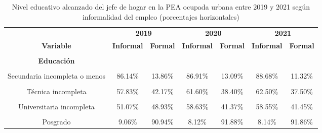 \documentclass[
  letterpaper,
  12pt,
  oneside,
  spanish,
  doublespacing,
  headsepline,
  parskip]{MastersDoctoralThesis}
\begin{document}
\hypertarget{tbl-edu}{}
\begin{table}[H]
\caption{\label{tbl-edu}Nivel educativo alcanzado del jefe de hogar en la PEA ocupada urbana
entre 2019 y 2021 según informalidad del empleo (porcentajes
horizontales) }\tabularnewline

\centering\begingroup\fontsize{10}{12}\selectfont

\begin{tabular}{ccccccc}
\toprule
\multicolumn{1}{c}{ } & \multicolumn{2}{c}{\textbf{2019}} & \multicolumn{2}{c}{\textbf{2020}} & \multicolumn{2}{c}{\textbf{2021}} \\
\cmidrule(l{3pt}r{3pt}){2-3} \cmidrule(l{3pt}r{3pt}){4-5} \cmidrule(l{3pt}r{3pt}){6-7}
\textbf{Variable} & \textbf{Informal} & \textbf{Formal} & \textbf{Informal} & \textbf{Formal} & \textbf{Informal} & \textbf{Formal}\\
\midrule
\cellcolor{gray!6}{\textbf{Nacional}} & \cellcolor{gray!6}{62.98\%} & \cellcolor{gray!6}{37.02\%} & \cellcolor{gray!6}{66.17\%} & \cellcolor{gray!6}{33.83\%} & \cellcolor{gray!6}{68.45\%} & \cellcolor{gray!6}{31.55\%}\\
\textbf{Educación} &  &  &  &  &  & \\
\cellcolor{gray!6}{Sin nivel} & \cellcolor{gray!6}{92.71\%} & \cellcolor{gray!6}{7.29\%} & \cellcolor{gray!6}{93.52\%} & \cellcolor{gray!6}{6.48\%} & \cellcolor{gray!6}{95.58\%} & \cellcolor{gray!6}{4.42\%}\\
Secundaria incompleta o menos & 86.14\% & 13.86\% & 86.91\% & 13.09\% & 88.68\% & 11.32\%\\
\cellcolor{gray!6}{Secundaria completa} & \cellcolor{gray!6}{66.49\%} & \cellcolor{gray!6}{33.51\%} & \cellcolor{gray!6}{71.54\%} & \cellcolor{gray!6}{28.46\%} & \cellcolor{gray!6}{72.47\%} & \cellcolor{gray!6}{27.53\%}\\
\addlinespace
Técnica incompleta & 57.83\% & 42.17\% & 61.60\% & 38.40\% & 62.50\% & 37.50\%\\
\cellcolor{gray!6}{Técnica completa} & \cellcolor{gray!6}{39.25\%} & \cellcolor{gray!6}{60.75\%} & \cellcolor{gray!6}{38.92\%} & \cellcolor{gray!6}{61.08\%} & \cellcolor{gray!6}{42.80\%} & \cellcolor{gray!6}{57.20\%}\\
Universitaria incompleta & 51.07\% & 48.93\% & 58.63\% & 41.37\% & 58.55\% & 41.45\%\\
\cellcolor{gray!6}{Universitaria completa} & \cellcolor{gray!6}{25.03\%} & \cellcolor{gray!6}{74.97\%} & \cellcolor{gray!6}{24.89\%} & \cellcolor{gray!6}{75.11\%} & \cellcolor{gray!6}{26.88\%} & \cellcolor{gray!6}{73.12\%}\\
Posgrado & 9.06\% & 90.94\% & 8.12\% & 91.88\% & 8.14\% & 91.86\%\\
\bottomrule
\end{tabular}
\endgroup{}
\end{table}
\end{document}
